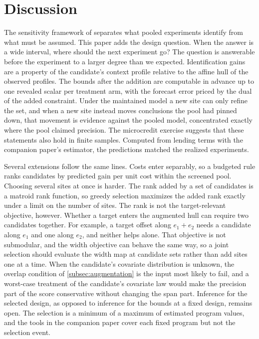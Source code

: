 \section{Discussion}
\label{sec:discussion}

The sensitivity framework of \citet{boyarsky2026} separates what pooled
experiments identify from what must be assumed. This paper adds the design question. When the answer is a wide interval,
where should the next experiment go? The question is answerable before
the experiment to a larger degree than we expected. Identification
gains are a property of the candidate's context profile relative to the
affine hull of the observed profiles. The bounds after the addition are
computable in advance up to one revealed scalar per treatment arm, with
the forecast error priced by the dual of the added constraint. Under the
maintained model a new site can only refine the set, and when a new site
instead moves conclusions the pool had pinned down, that movement is
evidence against the pooled model, concentrated exactly where the pool
claimed precision. The microcredit exercise suggests that these statements also hold in
finite samples. Computed from lending terms with the companion paper's
estimator, the predictions matched the realized experiments.

Several extensions follow the same lines. Costs enter separably, so a
budgeted rule ranks candidates by predicted gain per unit cost within
the screened pool. Choosing several sites at once is harder. The rank added by a set of
candidates is a matroid rank function, so greedy selection maximizes the
added rank exactly under a limit on the number of sites. The rank is not
the target-relevant objective, however. Whether a target enters the
augmented hull can require two candidates together. For example, a
target offset along $e_1+e_2$ needs a candidate along $e_1$ and one along
$e_2$, and neither helps alone. That objective is not submodular, and the
width objective can behave the same way, so a joint selection should
evaluate the width map at candidate sets rather than add sites one at a
time.
When the candidate's covariate distribution is unknown, the overlap condition of \cref{subsec:augmentation} is the input most
likely to fail, and a
worst-case treatment of the candidate's covariate law would make the
precision part of the score conservative without changing the span
part. Inference for the selected design, as opposed to inference for
the bounds at a fixed design, remains open. The selection is a minimum of a maximum of estimated
program values, and the tools in the
companion paper cover each fixed program but not the selection event.

